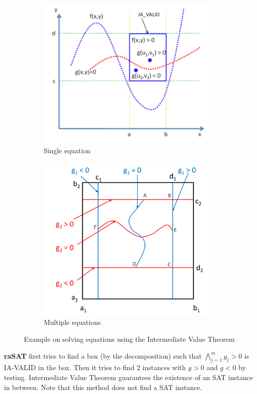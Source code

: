 \documentclass[runningheads,a4paper,oribibl]{llncs}
\begin{document}
\vspace{-0.5cm}
\begin{figure}
\centering
\begin{subfigure}{0.4\textwidth}
\includegraphics[width=1.\linewidth]{singleEquation.png} 
\caption{Single equation}
\label{fig:single-equation}
\end{subfigure}
\begin{subfigure}{0.4\textwidth}
\includegraphics[width=1.\linewidth]{multipleEquations.png}  
\caption{Multiple equations}
\label{fig:multiple-equations}  
\end{subfigure}
\caption{Example on solving equations using the Intermediate Value Theorem}
\end{figure}
    {\bf raSAT} first tries to find a box (by the decomposition) such that
    $\bigwedge \limits_{j=1}^m g_j > 0$ is IA-VALID in the box.
    Then it tries to find 2 instances with $g > 0$ and $g < 0$ by testing. 
    Intermediate Value Theorem guarantees the existence of an SAT instance
    in between. Note that this method does not find a SAT instance. 
\end{document}
